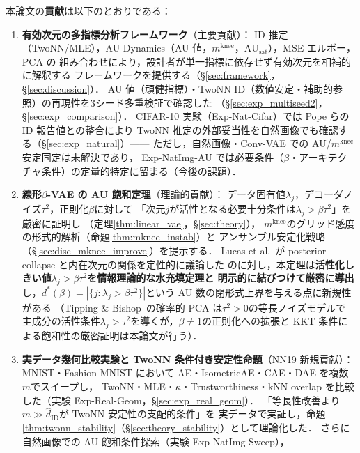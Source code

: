 \documentclass[11pt,a4paper]{jsarticle}
\newcommand{\kap}{\kappa}
\newcommand{\AUsat}{\mathrm{AU}_{\mathrm{sat}}}
\newcommand{\mknee}{m^{\mathrm{knee}}}
\begin{document}
本論文の\textbf{貢献}は以下のとおりである：
\begin{enumerate}
  \item \textbf{有効次元の多指標分析フレームワーク}（主要貢献）：
        ID 推定（TwoNN/MLE），AU Dynamics（AU 値，$\mknee$，$\AUsat$），MSE エルボー，PCA の
        組み合わせにより，設計者が単一指標に依存せず有効次元を相補的に解釈する
        フレームワークを提供する（§\ref{sec:framework}，§\ref{sec:discussion}）．
        AU 値（頑健指標）・TwoNN ID（数値安定・補助的参照）の再現性を3シード多重検証で確認した
        （§\ref{sec:exp_multiseed2}，§\ref{sec:exp_comparison}）．
        CIFAR-10 実験（Exp-Nat-Cifar）では Pope ら\cite{pope2021intrinsic}の ID 報告値との整合により
        TwoNN 推定の外部妥当性を自然画像でも確認する（§\ref{sec:exp_natural}）——
        ただし，自然画像・Conv-VAE での AU/$\mknee$ 安定同定は未解決であり，
        Exp-NatImg-AU では必要条件（$\beta$・アーキテクチャ条件）の定量的特定に留まる（今後の課題）．
  \item \textbf{線形$\beta$-VAE の AU 飽和定理}（理論的貢献）：
        データ固有値$\lambda_j$，デコーダノイズ$\tau^2$，正則化$\beta$に対して
        「次元$j$が活性となる必要十分条件は$\lambda_j > \beta\tau^2$」を厳密に証明し
        （定理\ref{thm:linear_vae}，§\ref{sec:theory}），
        $\mknee$のグリッド感度の形式的解析（命題\ref{thm:mknee_instab}）と
        アンサンブル安定化戦略（§\ref{sec:disc_mknee_improve}）を提示する．
        Lucas et al.~\cite{lucas2019elbo}が posterior collapse と内在次元の関係を定性的に議論した
        のに対し，本定理は\textbf{活性化しきい値$\lambda_j > \beta\tau^2$を情報理論的な水充填定理と
        明示的に結びつけて厳密に導出}し，$d^*(\beta) = |\{j:\lambda_j > \beta\tau^2\}|$という
        AU 数の閉形式上界を与える点に新規性がある
        （Tipping \& Bishop~\cite{tippingbishop1999ppca}の確率的 PCA は$\tau^2 > 0$の等長ノイズモデルで
        主成分の活性条件$\lambda_j > \tau^2$を導くが，$\beta \neq 1$の正則化への拡張と
        KKT 条件による飽和性の厳密証明は本論文が行う）．
  \item \textbf{実データ幾何比較実験と TwoNN 条件付き安定性命題}（NN19 新規貢献）：
        MNIST・Fashion-MNIST において AE・IsometricAE・CAE・DAE を複数$m$でスイープし，
        TwoNN・MLE・$\kap$・Trustworthiness・kNN overlap を比較した（実験 Exp-Real-Geom，§\ref{sec:exp_real_geom}）．
        「等長性改善より$m \gg \hat{d}_\mathrm{ID}$が TwoNN 安定性の支配的条件」を
        実データで実証し，命題\ref{thm:twonn_stability}（§\ref{sec:theory_stability}）として理論化した．
        さらに自然画像での AU 飽和条件探索（実験 Exp-NatImg-Sweep），

\end{enumerate}
\end{document}
